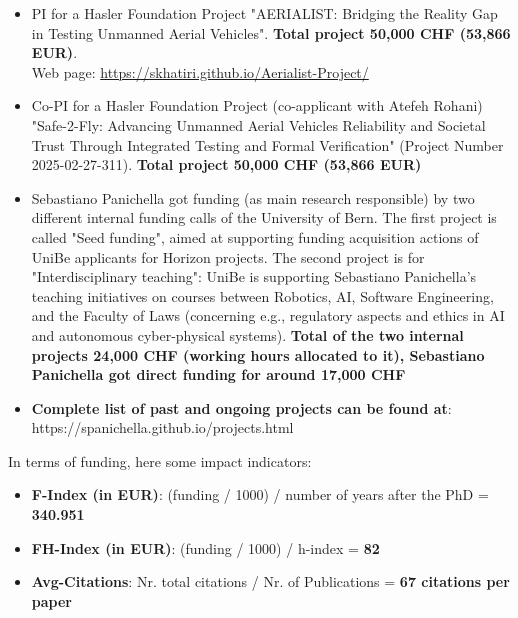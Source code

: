\documentclass[11pt]{article}
\begin{document}
\begin{itemize}
\vspace{-2.5mm}
  \item PI for a Hasler Foundation Project "AERIALIST: Bridging the Reality Gap in Testing Unmanned Aerial Vehicles".  
\textbf{Total project 50,000 CHF (53,866 EUR)}. \\Web page: \href{https://skhatiri.github.io/Aerialist-Project/}{https://skhatiri.github.io/Aerialist-Project/} 
\vspace{-2.5mm}
  \item Co-PI for a Hasler Foundation Project (co-applicant with Atefeh Rohani) "Safe-2-Fly: Advancing Unmanned Aerial Vehicles Reliability and Societal Trust Through Integrated Testing and Formal Verification" (Project Number 2025-02-27-311).
\textbf{Total project 50,000 CHF (53,866 EUR)} 
\vspace{-2.5mm}
  \item Sebastiano Panichella got funding (as main research responsible) by two different internal funding calls of the University of Bern. 
The first project is called "Seed funding", aimed at supporting funding acquisition actions of UniBe applicants for Horizon projects.
The second project is for "Interdisciplinary teaching": UniBe is supporting Sebastiano Panichella's teaching initiatives on courses between Robotics, AI, Software Engineering, and the Faculty of Laws (concerning e.g., regulatory aspects and ethics in AI and autonomous cyber-physical systems).
\textbf{Total of the two internal projects 24,000 CHF (working hours allocated to it), Sebastiano Panichella got direct funding for around 17,000 CHF}
\vspace{-2.5mm}
  \item \textbf{Complete list of past and ongoing projects can be found at}:  https://spanichella.github.io/projects.html
\vspace{-3.5mm}
\end{itemize}


In terms of funding, here some impact indicators:
\begin{itemize}
  \item \textbf{F-Index (in EUR)}: (funding / 1000) / number of years after the PhD = \textbf{340.951}
  \item \textbf{FH-Index (in EUR)}: (funding / 1000) / h-index = \textbf{82}
  \item \textbf{Avg-Citations}: Nr. total citations / Nr. of Publications = \textbf{67 citations per paper}
\end{itemize}
\end{document}
